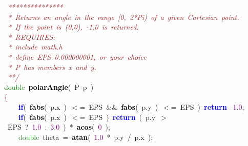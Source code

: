 {{\mbox{}\textit{\textcolor{Brown}{\ ***************}} \\
\mbox{}\textit{\textcolor{Brown}{\ *\ Returns\ an\ angle\ in\ the\ range\ [0,\ 2*Pi)\ of\ a\ given\ Cartesian\ point.}} \\
\mbox{}\textit{\textcolor{Brown}{\ *\ If\ the\ point\ is\ (0,0),\ -1.0\ is\ returned.}} \\
\mbox{}\textit{\textcolor{Brown}{\ *\ REQUIRES:}} \\
\mbox{}\textit{\textcolor{Brown}{\ *\ include\ math.h}} \\
\mbox{}\textit{\textcolor{Brown}{\ *\ define\ EPS\ 0.000000001,\ or\ your\ choice}} \\
\mbox{}\textit{\textcolor{Brown}{\ *\ P\ has\ members\ x\ and\ y.}} \\
\mbox{}\textit{\textcolor{Brown}{\ **/}} \\
\mbox{}\textcolor{ForestGreen}{double}\ \textbf{\textcolor{Black}{polarAngle}}\textcolor{BrickRed}{(}\ P\ p\ \textcolor{BrickRed}{)} \\
\mbox{}\textcolor{Red}{\{} \\
\mbox{}\ \ \ \ \textbf{\textcolor{Blue}{if}}\textcolor{BrickRed}{(}\ \textbf{\textcolor{Black}{fabs}}\textcolor{BrickRed}{(}\ p\textcolor{BrickRed}{.}x\ \textcolor{BrickRed}{)}\ \textcolor{BrickRed}{$<$=}\ EPS\ \textcolor{BrickRed}{\&\&}\ \textbf{\textcolor{Black}{fabs}}\textcolor{BrickRed}{(}\ p\textcolor{BrickRed}{.}y\ \textcolor{BrickRed}{)}\ \textcolor{BrickRed}{$<$=}\ EPS\ \textcolor{BrickRed}{)}\ \textbf{\textcolor{Blue}{return}}\ \textcolor{BrickRed}{-}\textcolor{Purple}{1.0}\textcolor{BrickRed}{;} \\
\mbox{}\ \ \ \ \textbf{\textcolor{Blue}{if}}\textcolor{BrickRed}{(}\ \textbf{\textcolor{Black}{fabs}}\textcolor{BrickRed}{(}\ p\textcolor{BrickRed}{.}x\ \textcolor{BrickRed}{)}\ \textcolor{BrickRed}{$<$=}\ EPS\ \textcolor{BrickRed}{)}\ \textbf{\textcolor{Blue}{return}}\ \textcolor{BrickRed}{(}\ p\textcolor{BrickRed}{.}y\ \textcolor{BrickRed}{$>$}\ EPS\ \textcolor{BrickRed}{?}\ \textcolor{Purple}{1.0}\ \textcolor{BrickRed}{:}\ \textcolor{Purple}{3.0}\ \textcolor{BrickRed}{)}\ \textcolor{BrickRed}{*}\ \textbf{\textcolor{Black}{acos}}\textcolor{BrickRed}{(}\ \textcolor{Purple}{0}\ \textcolor{BrickRed}{);} \\
\mbox{}\ \ \ \ \textcolor{ForestGreen}{double}\ theta\ \textcolor{BrickRed}{=}\ \textbf{\textcolor{Black}{atan}}\textcolor{BrickRed}{(}\ \textcolor{Purple}{1.0}\ \textcolor{BrickRed}{*}\ p\textcolor{BrickRed}{.}y\ \textcolor{BrickRed}{/}\ p\textcolor{BrickRed}{.}x\ \textcolor{BrickRed}{);} \\
}}
